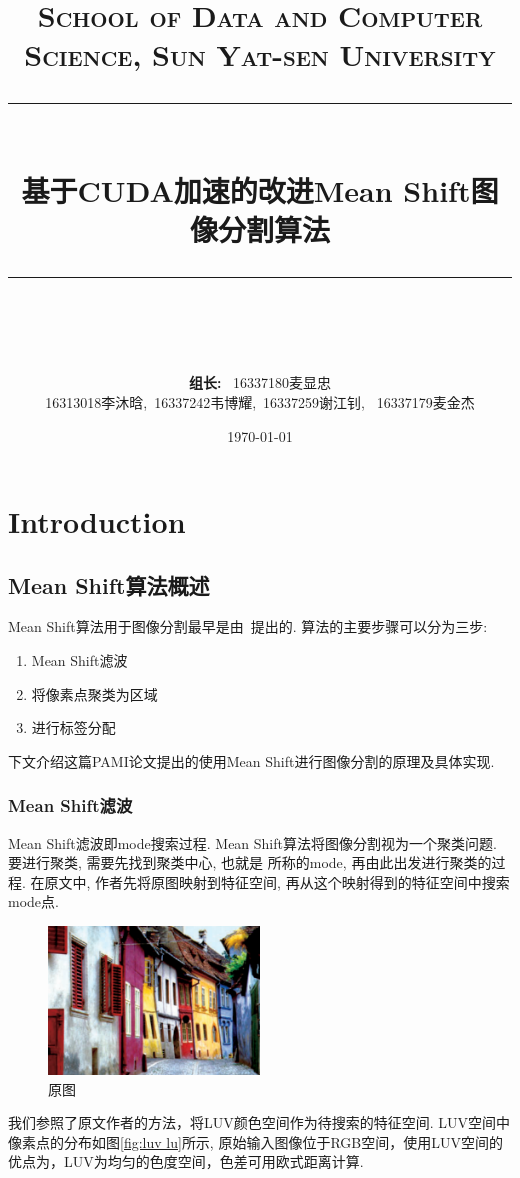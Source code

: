 \documentclass[a4paper, 11pt]{article}
\title{	
\normalfont \normalsize
\textsc{School of Data and Computer Science, Sun Yat-sen University} \\ [25pt] %
\rule{\textwidth}{0.5pt} \\[0.4cm] %
\huge  基于CUDA加速的改进Mean Shift图像分割算法\\ %
\rule{\textwidth}{2pt} \\[0.5cm] %
\author{ \textbf{组长: }\ 16337180麦显忠\\ 16313018李沐晗,\ 16337242韦博耀,\ 16337259谢江钊, \ 16337179麦金杰}
\date{\normalsize\today}
}
\begin{document}
\maketitle


\tableofcontents
\newpage


\section{Introduction}

\subsection{Mean Shift算法概述}
Mean Shift算法用于图像分割最早是由~\autocite{comaniciu2002mean}提出的. 算法的主要步骤可以分为三步:
\begin{enumerate}
    \item Mean Shift滤波
    \item 将像素点聚类为区域
    \item 进行标签分配
\end{enumerate}

下文介绍这篇PAMI论文提出的使用Mean Shift进行图像分割的原理及具体实现.

\subsubsection{Mean Shift滤波}
Mean Shift滤波即mode搜索过程. Mean Shift算法将图像分割视为一个聚类问题. 要进行聚类, 需要先找到聚类中心, 也就是
所称的mode, 再由此出发进行聚类的过程. 在原文中, 作者先将原图映射到特征空间, 再从这个映射得到的特征空间中搜索mode点.

\begin{figure}[!htb]
    \label{fig:figure1}
\centering
\includegraphics[width=0.5\textwidth]{images/origin.png}
\caption{原图}
\end{figure}

我们参照了原文作者的方法，将LUV颜色空间作为待搜索的特征空间. LUV空间中像素点的分布如图\ref{fig:luv lu}所示, 原始输入图像位于RGB空间，使用LUV空间的优点为，LUV为均匀的色度空间，色差可用欧式距离计算. 
\end{document}
